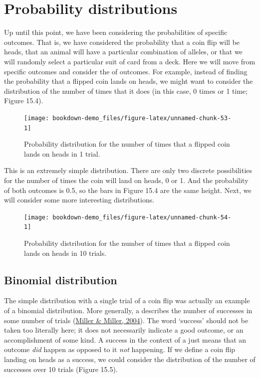 \documentclass[
  openany]{krantz}
\begin{document}
\hypertarget{probability-distributions}{%
\section{Probability distributions}\label{probability-distributions}}

Up until this point, we have been considering the probabilities of specific outcomes.
That is, we have considered the probability that a coin flip will be heads, that an animal will have a particular combination of alleles, or that we will randomly select a particular suit of card from a deck.
Here we will move from specific outcomes and consider the \emph{} of outcomes.
For example, instead of finding the probability that a flipped coin lands on heads, we might want to consider the distribution of the number of times that it does (in this case, 0 times or 1 time; Figure 15.4).

\begin{figure}
\texttt{[image: bookdown-demo\_files/figure-latex/unnamed-chunk-53-1]} \caption{Probability distribution for the number of times that a flipped coin lands on heads in 1 trial.}\label{fig:unnamed-chunk-53}
\end{figure}

This is an extremely simple distribution.
There are only two discrete possibilities for the number of times the coin will land on heads, 0 or 1.
And the probability of both outcomes is 0.5, so the bars in Figure 15.4 are the same height.
Next, we will consider some more interesting distributions.

\begin{figure}
\texttt{[image: bookdown-demo\_files/figure-latex/unnamed-chunk-54-1]} \caption{Probability distribution for the number of times that a flipped coin lands on heads in 10 trials.}\label{fig:unnamed-chunk-54}
\end{figure}

\hypertarget{binomial-distribution}{%
\subsection{Binomial distribution}\label{binomial-distribution}}

The simple distribution with a single trial of a coin flip was actually an example of a binomial distribution.
More generally, a  describes the number of successes in some number of trials (\protect\hyperlink{ref-Miller2004}{Miller \& Miller, 2004}).
The word `success' should not be taken too literally here; it does not necessarily indicate a good outcome, or an accomplishment of some kind.
A success in the context of a  just means that an outcome \emph{did} happen as opposed to it \emph{not} happening.
If we define a coin flip landing on heads as a success, we could consider the  distribution of the number of successes over 10 trials (Figure 15.5).
\end{document}
